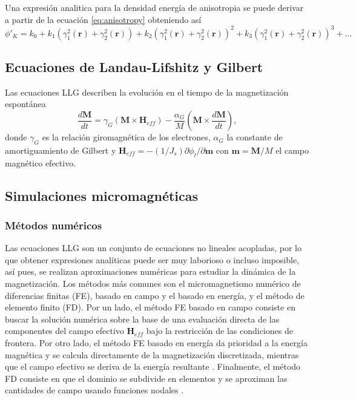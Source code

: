Una expresión analitica para la densidad energía de anisotropia se puede derivar a partir de la ecuación \ref{eq:anisotropy} obteniendo así \[ \phi'_K = k_0 + k_1 (\gamma_1^2 (\mathbf{r}) + \gamma_2^2 (\mathbf{r})) + k_2 (\gamma_1^2 (\mathbf{r}) + \gamma_2^2 (\mathbf{r}))^2 + k_3 (\gamma_1^2 (\mathbf{r}) + \gamma_2^2 (\mathbf{r}))^3 + \dotsc \]

\subsection{Ecuaciones de Landau-Lifshitz y Gilbert}
Las ecuaciones LLG describen la evolución en el tiempo de la magnetización espontánea \cite{Exl2020} \[ \frac{d \mathbf{M}}{dt} = \gamma_G (\mathbf{M} \times \mathbf{H}_{eff}) - \frac{\alpha_G}{M}(\mathbf{M} \times \frac{d \mathbf{M}}{dt}),\] donde $\gamma_G$ es la relación giromagnética de los electrones, $\alpha_G$ la constante de amortiguamiento de Gilbert y $\mathbf{H}_{eff} = - (1/J_s) \partial \phi_l / \partial \mathbf{m}$ con $\mathbf{m} = \mathbf{M}/M$ el campo magnético efectivo. 
\subsection{Simulaciones micromagnéticas}
\subsubsection{Métodos numéricos}
Las ecuaciones LLG son un conjunto de ecuaciones no lineales acopladas, por lo que obtener expresiones analíticas puede ser muy laborioso o incluso imposible, así pues, se realizan aproximaciones numéricas para estudiar la dinámica de la magnetización. Los métodos más comunes son el micromagnetismo numérico de diferencias finitas (FE), basado en campo y el basado en energía, y el método de elemento finito (FD). Por un lado, el método FE basado en campo consiste en buscar la solución numérica sobre la base de una evaluación directa de las componentes del campo efectivo $\mathbf{H}_{eff}$ bajo la restricción de las condiciones de frontera. Por otro lado, el método FE basado en energía da prioridad a la energía magnética y se calcula directamente de la magnetización discretizada, mientras que el campo efectivo se deriva de la energía resultante \cite{miltat2007numerical}. Finalmente, el método FD consiste en que el dominio se subdivide en elementos y se aproximan las cantidades de campo usando funciones nodales \cite{FiniteElement}.

